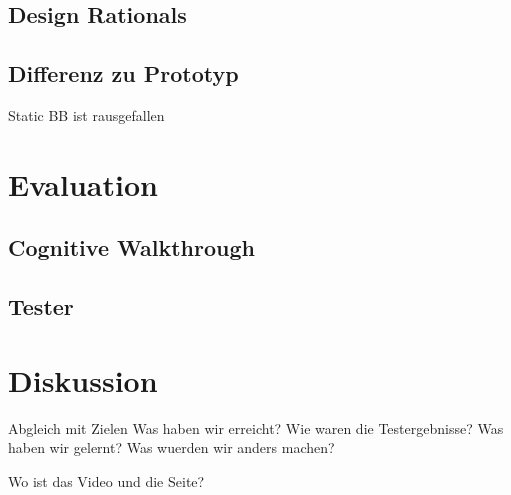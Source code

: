 \subsection{Design Rationals}

\subsection{Differenz zu Prototyp}
Static BB ist rausgefallen


\section{Evaluation}

\subsection{Cognitive Walkthrough}

\subsection{Tester}

\section{Diskussion}
Abgleich mit Zielen
Was haben wir erreicht?
Wie waren die Testergebnisse?
Was haben wir gelernt?
Was wuerden wir anders machen?

Wo ist das Video und die Seite?